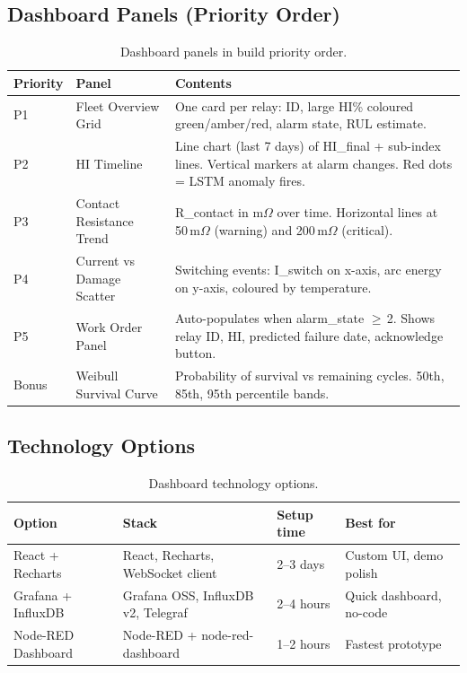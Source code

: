\documentclass[12pt,a4paper]{article}
\begin{document}
\subsection{Dashboard Panels (Priority Order)}

\begin{table}[H]
\centering
\begin{tabularx}{\textwidth}{llX}
\toprule
\textbf{Priority} & \textbf{Panel} & \textbf{Contents} \\
\midrule
P1 & Fleet Overview Grid   & One card per relay: ID, large HI\% coloured green/amber/red, alarm state, RUL estimate. \\
P2 & HI Timeline           & Line chart (last 7 days) of HI\_final + sub-index lines. Vertical markers at alarm changes. Red dots = LSTM anomaly fires. \\
P3 & Contact Resistance Trend & R\_contact in m$\Omega$ over time. Horizontal lines at 50\,m$\Omega$ (warning) and 200\,m$\Omega$ (critical). \\
P4 & Current vs Damage Scatter & Switching events: I\_switch on x-axis, arc energy on y-axis, coloured by temperature. \\
P5 & Work Order Panel      & Auto-populates when alarm\_state $\geq$\,2. Shows relay ID, HI, predicted failure date, acknowledge button. \\
Bonus & Weibull Survival Curve & Probability of survival vs remaining cycles. 50th, 85th, 95th percentile bands. \\
\bottomrule
\end{tabularx}
\caption{Dashboard panels in build priority order.}
\end{table}

\subsection{Technology Options}

\begin{table}[H]
\centering
\begin{tabularx}{\textwidth}{lXll}
\toprule
\textbf{Option} & \textbf{Stack} & \textbf{Setup time} & \textbf{Best for} \\
\midrule
React + Recharts   & React, Recharts, WebSocket client & 2--3 days   & Custom UI, demo polish \\
Grafana + InfluxDB & Grafana OSS, InfluxDB v2, Telegraf & 2--4 hours & Quick dashboard, no-code \\
Node-RED Dashboard & Node-RED + node-red-dashboard     & 1--2 hours  & Fastest prototype \\
\bottomrule
\end{tabularx}
\caption{Dashboard technology options.}
\end{table}
\end{document}
